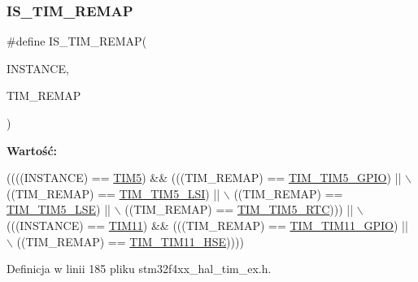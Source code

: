 \subsubsection{\texorpdfstring{I\+S\+\_\+\+T\+I\+M\+\_\+\+R\+E\+M\+AP}{IS\_TIM\_REMAP}}
{\footnotesize\ttfamily \#define I\+S\+\_\+\+T\+I\+M\+\_\+\+R\+E\+M\+AP(\begin{DoxyParamCaption}\item[{}]{I\+N\+S\+T\+A\+N\+CE,  }\item[{}]{T\+I\+M\+\_\+\+R\+E\+M\+AP }\end{DoxyParamCaption})}

{\bfseries Wartość\+:}
\begin{DoxyCode}
((((INSTANCE) == \hyperlink{group___peripheral__declaration_ga5125ff6a23a2ed66e2e19bd196128c14}{TIM5})  && (((TIM\_REMAP) == \hyperlink{group___t_i_m_ex___remap_ga8525d77a5f6fea05530e812e991e4d6d}{TIM\_TIM5\_GPIO})           || \(\backslash\)
                                    ((TIM\_REMAP) == \hyperlink{group___t_i_m_ex___remap_ga62000fc12a4ed5909723b881533a2f93}{TIM\_TIM5\_LSI})            || \(\backslash\)
                                    ((TIM\_REMAP) == \hyperlink{group___t_i_m_ex___remap_ga9f09de021d2f68730c952b4f0ebb82bc}{TIM\_TIM5\_LSE})            || \(\backslash\)
                                    ((TIM\_REMAP) == \hyperlink{group___t_i_m_ex___remap_ga93e312581ffb28601b36b4f8b240df79}{TIM\_TIM5\_RTC})))          || \(\backslash\)
         (((INSTANCE) == \hyperlink{group___peripheral__declaration_gacfd11ef966c7165f57e2cebe0abc71ad}{TIM11}) && (((TIM\_REMAP) == \hyperlink{group___t_i_m_ex___remap_gac8a0bac87924350651da1957081bc9ae}{TIM\_TIM11\_GPIO})          || \(\backslash\)
                                    ((TIM\_REMAP) == \hyperlink{group___t_i_m_ex___remap_ga3b08e8165670e3034401099aada7712d}{TIM\_TIM11\_HSE}))))
\end{DoxyCode}


Definicja w linii 185 pliku stm32f4xx\+\_\+hal\+\_\+tim\+\_\+ex.\+h.

